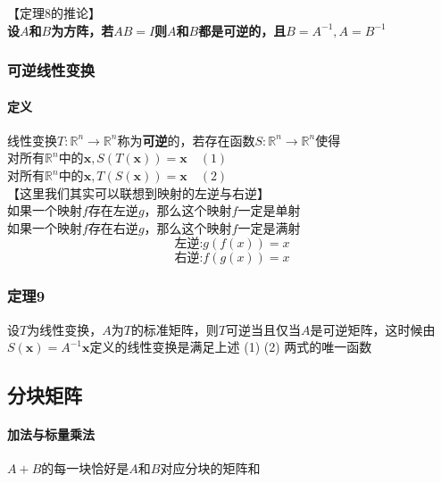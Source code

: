 \documentclass{article}
\newcommand{\ve}{\boldsymbol}
\begin{document}
\begin{CJK}{UTF8}{gkai}
【定理8的推论】\\
\textbf{设$A$和$B$为方阵，若$AB=I$则$A$和$B$都是可逆的，且$B=A^{-1},A=B^{-1}$}\\

\subsubsection{可逆线性变换}
\paragraph{定义\\}
线性变换$T:\mathbb{R}^n\to\mathbb{R}^n$称为\textbf{可逆}的，若存在函数$S:\mathbb{R}^n\to\mathbb{R}^n$使得\\
对所有$\mathbb{R}^n$中的$\ve{x},S(T(\ve{x}))=\ve{x}\quad (1)$\\
对所有$\mathbb{R}^n$中的$\ve{x},T(S(\ve{x}))=\ve{x}\quad (2)$\\
【这里我们其实可以联想到映射的左逆与右逆】\\
如果一个映射$f$存在左逆$g$，那么这个映射$f$一定是单射\\
如果一个映射$f$存在右逆$g$，那么这个映射$f$一定是满射\\
\[\text{左逆:}g(f(x))=x\]\[\text{右逆:}f(g(x))=x\]
\subsubsection{定理9}
设$T$为线性变换，$A$为$T$的标准矩阵，则$T$可逆当且仅当$A$是可逆矩阵，这时候由$S (\ve{x}) =A^{-1}\ve{x}$定义的线性变换是满足上述 (1) (2) 两式的唯一函数\\
\subsection{分块矩阵}
\paragraph{加法与标量乘法\\}
$A+B$的每一块恰好是$A$和$B$对应分块的矩阵和\\

\end{CJK}
\end{document}
